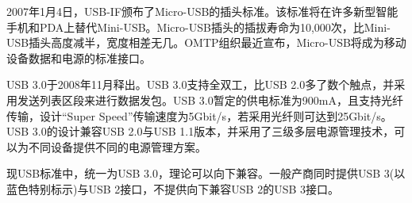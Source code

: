 2007年1月4日，USB-IF颁布了Micro-USB的插头标准。该标准将在许多新型智能手机和PDA上替代Mini-USB。Micro-USB插头的插拔寿命为10,000次，比Mini-USB插头高度减半，宽度相差无几。OMTP组织最近宣布，Micro-USB将成为移动设备数据和电源的标准接口。

USB 3.0于2008年11月释出。USB 3.0支持全双工，比USB 2.0多了数个触点，并采用发送列表区段来进行数据发包。USB 3.0暂定的供电标准为900mA，且支持光纤传输，设计“Super Speed”传输速度为5Gbit/s，若采用光纤则可达到25Gbit/s。USB 3.0的设计兼容USB 2.0与USB 1.1版本，并采用了三级多层电源管理技术，可以为不同设备提供不同的电源管理方案。

现USB标准中，统一为USB 3.0，理论可以向下兼容。一般产商同时提供USB 3(以蓝色特别标示)与USB 2接口，不提供向下兼容USB 2的USB 3接口。



